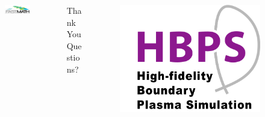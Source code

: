 \documentclass[aspectratio=169]{beamer}
\begin{document}
\begin{frame}
  \begin{columns}
    \begin{column}{.33\linewidth}
      \begin{figure}
        \centering
        \includegraphics[width=\linewidth]{fastmath_logo.png}
      \end{figure}
    \end{column}
    \begin{column}{.33\linewidth}
      \begin{center}
        {\huge
          Thank You\\
          \bigskip
          \bigskip
          Questions?\\
          \bigskip
        }
      \end{center}
    \end{column}
    \begin{column}{.33\linewidth}
      \begin{figure}
        \centering
        \includegraphics[width=\linewidth]{hbps_logo.png}
      \end{figure}

\end{column}
\end{columns}
\end{frame}
\end{document}
